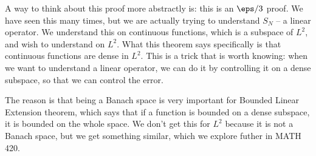 \begin{note}
    A way to think about this proof more abstractly is: this is an \(\eps/3\) proof. We have seen this many times, but we are actually trying to understand \(S_N\) -- a linear operator. We understand this on continuous functions, which is a subspace of \(L^2\), and wish to understand on \(L^2\). What this theorem says specifically is that continuous functions are dense in \(L^2\). This is a trick that is worth knowing: when we want to understand a linear operator, we can do it by controlling it on a dense subspace, so that we can control the error.

    \medskip
    
    The reason is that being a Banach space is very important for Bounded Linear Extension theorem, which says that if a function is bounded on a dense subspace, it is bounded on the whole space. We don't get this for \(L^2\) because it is not a Banach space, but we get something similar, which we explore futher in MATH 420.
\end{note}

